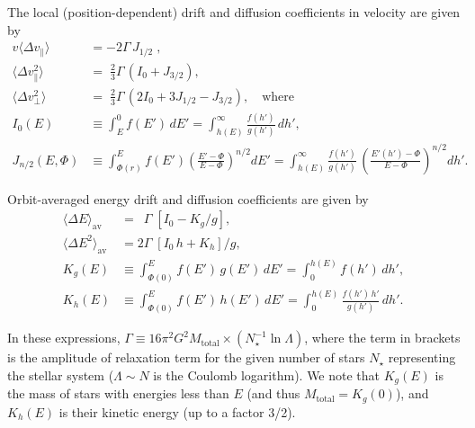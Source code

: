 \documentclass[12pt]{article}
\newcommand{\dvpar}{\langle \Delta v_\| \rangle}
\newcommand{\dvsqpar}{\langle \Delta v^2_\| \rangle}
\newcommand{\dvsqper}{\langle \Delta v^2_\bot \rangle}
\begin{document}
The local (position-dependent) drift and diffusion coefficients in velocity are given by
\begin{subequations}
\begin{align}
v\dvpar &= \textstyle -2\Gamma\, J_{1/2} \;,\\
\dvsqpar&= \textstyle \;\frac{2}{3}\Gamma\, \left(I_0 + J_{3/2}\right) , \\
\dvsqper&= \textstyle \;\frac{2}{3}\Gamma\, \left(2 I_0 + 3 J_{1/2} - J_{3/2}\right) , \quad\mbox{where} \\
I_0(E)     &\equiv \int_E^0 f(E')\, dE' = \int_{h(E)}^\infty \frac{f(h')}{g(h')}\, dh', \\
J_{n/2}(E,\Phi) &\equiv \int_{\Phi(r)}^E f(E') \left(\frac{E'-\Phi}{E-\Phi}\right)^{n/2} dE' = 
 \int_{h(E)}^\infty \frac{f(h')}{g(h')}\, \left(\frac{E'(h')-\Phi}{E-\Phi}\right)^{n/2} dh'.
\end{align}
\end{subequations}

Orbit-averaged energy drift and diffusion coefficients are given by
\begin{subequations}  \label{eq:DriftDiffusionE}
\begin{align}
\langle \Delta E   \rangle_\mathrm{av} &= \phantom{2} \Gamma\; \left[I_0 - K_g/g \right], \\
\langle \Delta E^2 \rangle_\mathrm{av} &= 2\Gamma\; \left[I_0\,h + K_h\right]/g, \\
K_g(E) &\equiv \int_{\Phi(0)}^E f(E')\,g(E')\,dE' = \int_0^{h(E)} f(h')\,dh', \\
K_h(E) &\equiv \int_{\Phi(0)}^E f(E')\,h(E')\,dE' = \int_0^{h(E)} \frac{f(h')\,h'}{g(h')}\,dh'.
\end{align}
\end{subequations}

In these expressions, $\Gamma  \equiv 16\pi^2 G^2 M_\mathrm{total} \times (N_\star^{-1}\ln\Lambda)$, where the term in brackets is the amplitude of relaxation term for the given number of stars $N_\star$ representing the stellar system ($\Lambda \sim N$ is the Coulomb logarithm). We note that $K_g(E)$ is the mass of stars with energies less than $E$ (and thus $M_\mathrm{total} = K_g(0)$), and $K_h(E)$ is their kinetic energy (up to a factor 3/2).
\end{document}
